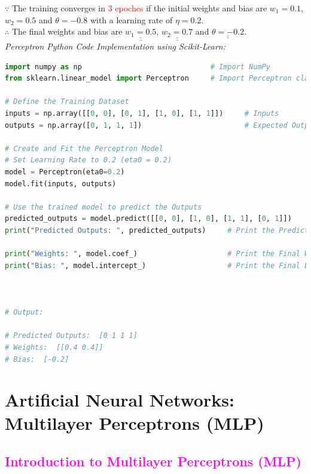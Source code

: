 \documentclass{book}
\begin{document}
$\because$ The training converges in \textcolor{red}{3 epoches} if the initial weights and bias are \(w_1 = 0.1\), \(w_2 = 0.5\) and \(\theta = -0.8\) with a learning rate of \(\eta = 0.2\).\\
$\therefore$ The final weights and bias are \(\underline{\underline{w_1 = 0.5}}\), \(\underline{\underline{w_2 = 0.7}}\) and \(\underline{\underline{\theta = -0.2}}\).\\
\vspace{3mm}
\textit{\large{Perceptron Python Code Implementation using Scikit-Learn:}}
\begin{lstlisting}[language=Python, basicstyle=\ttfamily\small, keywordstyle=\color{blue}, commentstyle=\color{forestgreen}, stringstyle=\color{red}, showstringspaces=false]
import numpy as np                              # Import NumPy
from sklearn.linear_model import Perceptron     # Import Perceptron class from Scikit-Learn

# Define the Training Dataset
inputs = np.array([[0, 0], [0, 1], [1, 0], [1, 1]])     # Inputs
outputs = np.array([0, 1, 1, 1])                        # Expected Outputs

# Create and Fit the Perceptron Model
# Set Learning Rate to 0.2 (eta0 = 0.2)
model = Perceptron(eta0=0.2)
model.fit(inputs, outputs)

# Use the trained model to predict the Outputs
predicted_outputs = model.predict([[0, 0], [1, 0], [1, 1], [0, 1]])
print("Predicted Outputs: ", predicted_outputs)     # Print the Predicted Outputs

print("Weights: ", model.coef_)                     # Print the Final Weights
print("Bias: ", model.intercept_)                   # Print the Final Bias



# Output:

# Predicted Outputs:  [0 1 1 1]
# Weights:  [[0.4 0.4]]
# Bias:  [-0.2]
\end{lstlisting}
\chapter{Artificial Neural Networks: Multilayer Perceptrons (MLP)}
\textcolor{magenta}{\section{\textbf{Introduction to Multilayer Perceptrons (MLP)}}}
\end{document}
